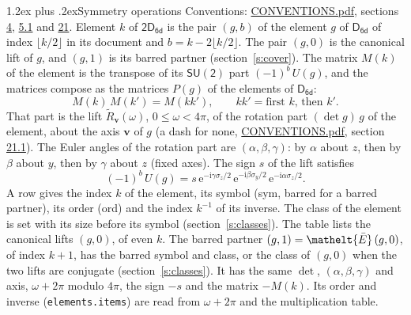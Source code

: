 \documentclass[10pt,a4paper]{article}
\makeatletter
\renewcommand\section{\@startsection{section}{1}{\z@}{-3ex plus -1ex minus -.2ex}%
  {1.2ex plus .2ex}{\normalfont\large\sffamily\bfseries\color{parttitle}}}
\numberwithin{equation}{section}
\newcommand{\eltfont}[1]{{\let\sigma\eltsigma\mathelt{#1}}}
\newcommand{\grp}[1]{\mathsf{#1}}
\newcommand{\elt}[1]{\eltfont{#1}}
\newcommand{\vv}{\mathbf{v}}
\newcommand{\iunit}{\mathrm{i}}
\newcommand{\expe}{\mathrm{e}}
\newcommand{\barred}[1]{\bar{#1}}
\newcommand{\lift}[1]{\tilde{#1}}
\newcommand{\pauli}[1]{\sigma_{#1}}
\makeatother
\begin{document}
\section{Symmetry operations}\label{s:elements}
Conventions: \href{../../CONVENTIONS.pdf}{CONVENTIONS.pdf}, sections \href{../../../rotation/CONVENTIONS.pdf\#conv.4}{4}, \href{../../../rotation/CONVENTIONS.pdf\#conv.5.1}{5.1} and \href{../../CONVENTIONS.pdf\#conv.21}{21}.
\leavevmode\label{n:index.element}\label{n:element.g}Element $k$ of $\grp{2D_{6d}}$ is the pair $(g, b)$ of the element $g$ of \href{../../../rotation/data/pdf/D6d.pdf}{$\grp{D_{6d}}$} of index $\lfloor k/2\rfloor$ in its document and $b = k - 2\lfloor k/2\rfloor$. The pair $(g, 0)$ is the canonical lift of $g$, and $(g, 1)$ is its barred partner (section~\ref{s:cover}). \label{n:matrix.element.pin}\label{n:matrix.element}The matrix $M(k)$ of the element is the transpose of its $\grp{SU(2)}$ part $(-1)^{b}\,U(g)$, and the matrices compose as the matrices $P(g)$ of the elements of $\grp{D_{6d}}$:
\begin{equation}\label{e:mprod}M(k)\,M(k') = M(kk'),\qquad kk' = \text{first } k\text{, then } k'.\end{equation}
\leavevmode\label{n:angle.omega}\label{n:vector.axis}\label{n:vector.pole}That part is the lift $\lift{R}_{\vv}(\omega)$, $0 \le \omega < 4\pi$, of the rotation part $(\det g)\,g$ of the element, about the axis $\vv$ of $g$ (a dash for none, \href{../../CONVENTIONS.pdf}{CONVENTIONS.pdf}, section \href{../../CONVENTIONS.pdf\#conv.21.1}{21.1}). \label{n:angle.euler.alpha}\label{n:angle.euler.beta}\label{n:angle.euler.gamma}\label{n:vector.coordinates}The Euler angles of the rotation part are $(\alpha,\beta,\gamma)$: by $\alpha$ about $z$, then by $\beta$ about $y$, then by $\gamma$ about $z$ (fixed axes). \label{n:local.euler.sign}The sign $s$ of the lift satisfies
\begin{equation}\label{e:euler}(-1)^{b}\,U(g) = s\,\expe^{-\iunit\gamma\pauli{z}/2}\,\expe^{-\iunit\beta\pauli{y}/2}\,\expe^{-\iunit\alpha\pauli{z}/2}.\end{equation}
\leavevmode\label{n:index.element.inverse}\label{n:head.sym}\label{n:head.ord}A row gives the index $k$ of the element, its symbol (sym, barred for a barred partner), its order (ord) and the index $k^{-1}$ of its inverse. \label{n:head.class}The class of the element is set with its size before its symbol (section~\ref{s:classes}).
The table lists the canonical lifts $(g, 0)$, of even $k$. The barred partner $(g, 1) = \elt{\barred{E}}\,(g, 0)$, of index $k + 1$, has the barred symbol and class, or the class of $(g, 0)$ when the two lifts are conjugate (section~\ref{s:classes}). It has the same $\det$, $(\alpha,\beta,\gamma)$ and axis, $\omega + 2\pi$ modulo $4\pi$, the sign $-s$ and the matrix $-M(k)$. Its order and inverse (\texttt{elements.items}) are read from $\omega + 2\pi$ and the multiplication table.
\end{document}
